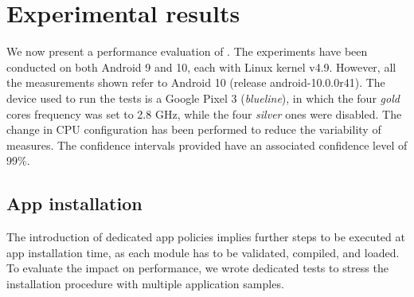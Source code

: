 \section{Experimental results}
\label{sect:seapp_performance}

We now present a performance evaluation of \seapp.  The experiments have
been conducted on both Android 9 and 10, each with Linux kernel v4.9.
However, all the measurements shown refer to Android 10 (release
android-10.0.0\textunderscore r41).  The device used to run the tests
is a Google Pixel 3 (\emph{blueline}), in which the four \emph{gold}
cores frequency was set to 2.8 GHz, while the four \emph{silver} ones
were disabled.  The change in CPU configuration has been performed to
reduce the variability of measures.  The confidence intervals provided
have an associated confidence level of 99\%.


\subsection{App installation}

The introduction of dedicated app policies implies further steps to be
executed at app installation time, as each \seapp module has to be
validated, compiled, and loaded.  To evaluate the impact on
performance, we wrote dedicated tests to stress the installation
procedure with multiple application samples.

